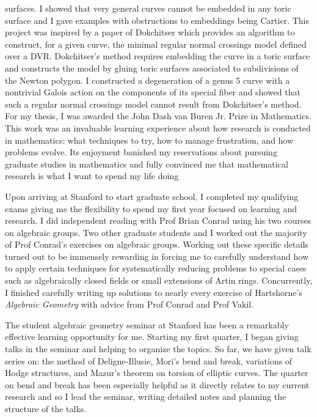 \documentclass[11pt]{article}
\begin{document}
surfaces. I showed that very general curves cannot be
embedded in any toric surface and I gave examples with obstructions to embeddings being
Cartier. This project was inspired by a paper of Dokchitser  which provides an algorithm to construct, for a given curve, the minimal regular normal crossings model defined over a DVR. Dokchitser's method
requires embedding the curve in a toric surface and constructs the model by gluing toric surfaces associated to subdivisions of the Newton polygon. I constructed a degeneration of a genus 5
curve with a nontrivial Galois action on the components of its special fiber and showed that such a regular
normal crossings model cannot result from Dokchitser's method. For my thesis, I was awarded the John Dash van Buren Jr. Prize in Mathematics. This work was an invaluable learning experience about how research is conducted in mathematics: what techniques to try, how to manage frustration, and how problems evolve. Its enjoyment banished my reservations about pursuing graduate studies in mathematics and fully convinced me that mathematical research is what I want to spend my life doing
\par 
Upon arriving at Stanford to start graduate school, I completed my qualifying exams giving me the flexibility to spend my first year focused on learning and research. I did independent reading with Prof Brian Conrad using his two courses on algebraic groups. Two other graduate students and I worked out the majority of Prof Conrad's exercises on algebraic groups. Working out these specific details turned out to be immensely rewarding in forcing me to carefully understand how to apply certain techniques for systematically reducing problems to special cases such as algebraically closed fields or small extensions of Artin rings. Concurrently, I finished carefully writing up solutions to nearly every exercise of Hartshorne's \textit{Algebraic Geometry} with advice from Prof Conrad and Prof Vakil.  
\par 
The student algebraic geometry seminar at Stanford has been a remarkably effective learning opportunity for me. Starting my first quarter, I began giving talks in the seminar and helping to organize the topics. So far, we have given talk series on: the method of Deligne-Illusie, Mori's bend and break, variations of Hodge structures, and Mazur's theorem on torsion of elliptic curves. The quarter on bend and break has been especially helpful as it directly relates to my current research and so I lead the seminar, writing detailed notes and planning the structure of the talks. 
\end{document}
